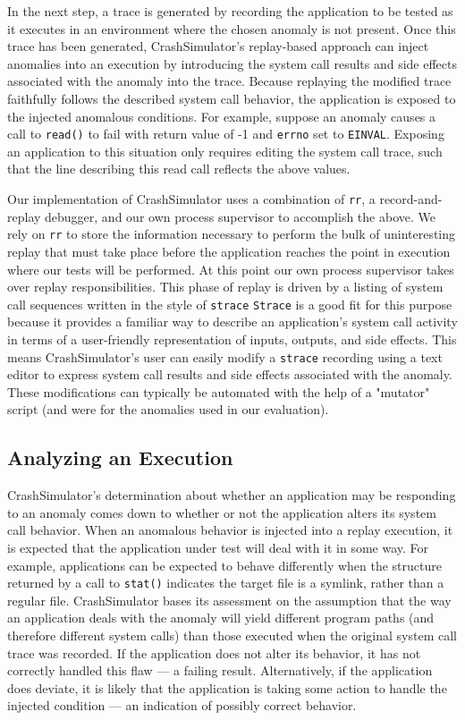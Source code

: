 In the next step, a trace is generated by recording the application to be
tested as it executes in an environment where the chosen anomaly is not
present.
Once this trace has been generated, CrashSimulator's replay-based approach
can inject anomalies into an execution by introducing
the system call results and side effects
associated with the anomaly into the trace.
Because replaying the modified
trace faithfully follows the described system call behavior, the
application is exposed to the injected
anomalous conditions.  For
example, suppose an anomaly causes a call to {\tt read()} to fail with
return value of -1 and {\tt errno} set to {\tt EINVAL}.  Exposing an
application to this situation only requires editing the system call trace,
such that the line describing this read call reflects the above values.

Our implementation of CrashSimulator uses a combination of {\tt rr}, a
record-and-replay debugger, and our own process supervisor
to accomplish the above.  We rely on {\tt rr}
to store the information necessary to perform the bulk of uninteresting
replay that must take place before the application reaches the point in
execution where our tests will be performed.  At this point our own process
supervisor takes over replay responsibilities.  This phase of replay is
driven by a listing of
system call sequences written in the style of {\tt strace}
{\tt Strace} is a good fit
for this purpose because it provides a familiar way to describe an
application's system call activity in terms of a user-friendly
representation of inputs, outputs, and side effects.
This means CrashSimulator's user can easily modify
a {\tt strace} recording using a text editor to express
system call results and side effects associated with the anomaly.  These
modifications can typically be automated with the help of a "mutator"
script (and were for the anomalies used in our evaluation).

\subsection{Analyzing an Execution}

CrashSimulator's determination about whether an application may be
responding to an anomaly comes down to whether or not
the application alters its
system call behavior.  When an anomalous
behavior is injected into a replay execution,
it is expected that the application under
test will deal with it in some way.  For example, applications can
be expected to behave differently when the structure returned by a call to
{\tt stat()} indicates the target file is a symlink, rather than a regular
file.  CrashSimulator bases its assessment on the assumption that the way
an
application deals with the anomaly will yield
different program paths (and therefore different system calls) than
those
executed when the original system call trace was recorded.
If the application
does not alter its behavior, it has not
correctly handled this flaw --- a failing result.  Alternatively, if the
application does deviate, it is likely that the application is taking some
action to handle the injected condition --- an indication of possibly
correct behavior.

